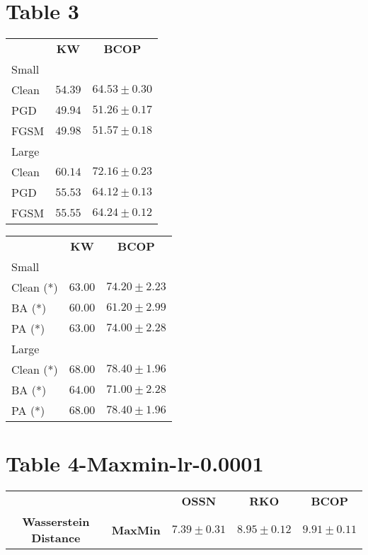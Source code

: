 \documentclass{article}%
\begin{document}
%
\section*{Table 3}%
\label{sec:Table3}%
\begin{minipage}{0.5\textwidth}%
\begin{tabularx}{\textwidth}{lcc}%
\textbf{}&\textbf{KW}&\textbf{BCOP}\\%
\cmidrule{1-3}%
Small&&\\%
\cmidrule{1-3}%
Clean&$54.39$&$\mathbf{64.53}\pm0.30$\\%
PGD&$49.94$&$\mathbf{51.26}\pm0.17$\\%
FGSM&$49.98$&$\mathbf{51.57}\pm0.18$\\%
\cmidrule{1-3}%
Large&&\\%
\cmidrule{1-3}%
Clean&$60.14$&$\mathbf{72.16}\pm0.23$\\%
PGD&$55.53$&$\mathbf{64.12}\pm0.13$\\%
FGSM&$55.55$&$\mathbf{64.24}\pm0.12$\\%
\end{tabularx}%
\end{minipage}%
\begin{minipage}{0.5\textwidth}%
\begin{tabularx}{\textwidth}{lcc}%
\textbf{}&\textbf{KW}&\textbf{BCOP}\\%
\cmidrule{1-3}%
Small&&\\%
\cmidrule{1-3}%
Clean (*)&$63.00$&$\mathbf{74.20}\pm2.23$\\%
BA (*)&$60.00$&$\mathbf{61.20}\pm2.99$\\%
PA (*)&$63.00$&$\mathbf{74.00}\pm2.28$\\%
\cmidrule{1-3}%
Large&&\\%
\cmidrule{1-3}%
Clean (*)&$68.00$&$\mathbf{78.40}\pm1.96$\\%
BA (*)&$64.00$&$\mathbf{71.00}\pm2.28$\\%
PA (*)&$68.00$&$\mathbf{78.40}\pm1.96$\\%
\end{tabularx}%
\end{minipage}

%
\section*{Table 4{-}Maxmin{-}lr{-}0.0001}%
\label{sec:Table4{-}Maxmin{-}lr{-}0.0001}%
\begin{tabularx}{\textwidth}{ccccc}%
\textbf{}&\textbf{}&\textbf{OSSN}&\textbf{RKO}&\textbf{BCOP}\\%
\cmidrule{1-5}%
\multirow{1}{*}{\textbf{Wasserstein Distance}}&\textbf{MaxMin}&$7.39\pm0.31$&$8.95\pm0.12$&$\mathbf{9.91}\pm0.11$\\%
\end{tabularx}
\end{document}
